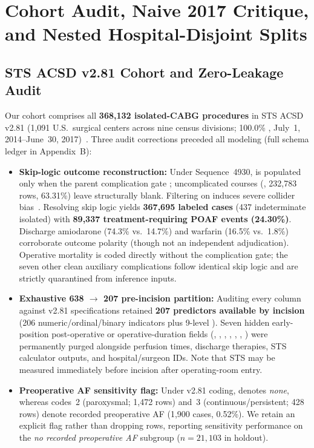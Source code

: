 \section{Cohort Audit, Naive 2017 Critique, and Nested Hospital-Disjoint Splits}
\label{sec:cohort_splits}

\subsection{STS ACSD v2.81 Cohort and Zero-Leakage Audit}
Our cohort comprises all \textbf{368,132 isolated-CABG procedures} in STS ACSD v2.81 (1,091 U.S.\ surgical centers across nine census divisions; 100.0\% , July~1, 2014--June~30, 2017)~\cite{sts2014v281,shahian2018sts,obrien2018sts2}. Three audit corrections preceded all modeling (full schema ledger in Appendix~B):
\begin{itemize}
  \item \textbf{Skip-logic outcome reconstruction:} Under Sequence~4930,  is populated only when the parent complication gate ; uncomplicated courses (, 232,783 rows, 63.31\%) leave  structurally blank. Filtering on  induces severe collider bias~\cite{hernan2020causal}. Resolving skip logic yields \textbf{367,695 labeled cases} (437 indeterminate isolated) with \textbf{89,337 treatment-requiring POAF events (24.30\%)}. Discharge amiodarone (74.3\% vs.\ 14.7\%) and warfarin (16.5\% vs.\ 1.8\%) corroborate outcome polarity (though not an independent adjudication). Operative mortality is coded directly without the complication gate; the seven other clean auxiliary complications follow identical skip logic and are strictly quarantined from inference inputs.
  \item \textbf{Exhaustive 638 $\to$ 207 pre-incision partition:} Auditing every column against v2.81 specifications retained \textbf{207 predictors available by incision} (206 numeric/ordinal/binary indicators plus 9-level ). Seven hidden early-position post-operative or operative-duration fields (, , , , , , ) were permanently purged alongside perfusion times, discharge therapies, STS calculator outputs, and hospital/surgeon IDs. Note that STS  may be measured immediately before incision after operating-room entry.
  \item \textbf{Preoperative AF sensitivity flag:} Under v2.81 coding,  denotes \emph{none}, whereas codes~2 (paroxysmal; 1,472 rows) and~3 (continuous/persistent; 428 rows) denote recorded preoperative AF (1,900 cases, 0.52\%). We retain an explicit flag rather than dropping rows, reporting sensitivity performance on the \emph{no recorded preoperative AF} subgroup ($n=21{,}103$ in holdout).
\end{itemize}

